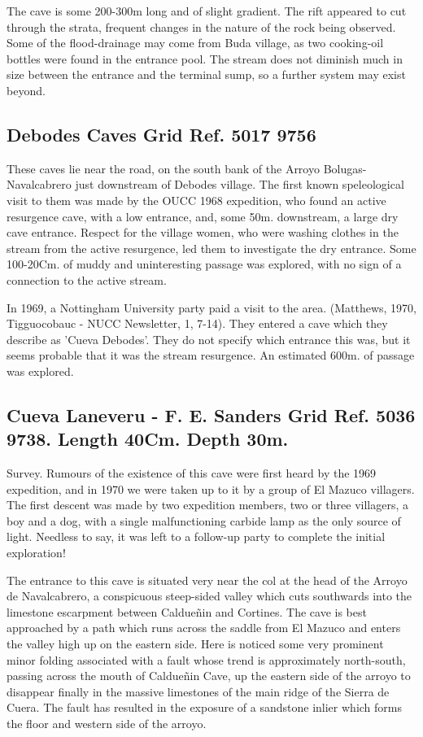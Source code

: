 \documentclass[11pt, a4paper, twoside]{memoir}
\begin{document}
The cave is some 200-300m long and of slight gradient. The rift appeared to cut through the strata, frequent changes in the nature of the rock being observed. Some of the flood-drainage may come from Buda village, as two cooking-oil bottles were found in the entrance pool. The stream does not diminish much in size between the entrance and the terminal sump, so a further system may exist beyond.



\subsection*{Debodes Caves Grid Ref. 5017 9756}


These caves lie near the road, on the south bank of the Arroyo Bolugas- Navalcabrero just downstream of Debodes village. The first known speleological visit to them was made by the OUCC 1968 expedition, who found an active resurgence cave, with a low entrance, and, some 50m. downstream, a large dry cave entrance. Respect for the village women, who were washing clothes in the stream from the active resurgence, led them to investigate the dry entrance. Some 100-20Cm. of muddy and uninteresting passage was explored, with no sign of a connection to the active stream.

In 1969, a Nottingham University party paid a visit to the area. (Matthews, 1970, Tigguocobauc - NUCC Newsletter, 1, 7-14). They entered a cave which they describe as 'Cueva Debodes'. They do not specify which entrance this was, but it seems probable that it was the stream resurgence. An estimated 600m. of passage was explored.



\subsection*{Cueva Laneveru - F. E. Sanders Grid Ref. 5036 9738. Length 40Cm. Depth 30m.}


Survey. Rumours of the existence of this cave were first heard by the 1969 expedition, and in 1970 we were taken up to it by a group of El Mazuco villagers. The first descent was made by two expedition members, two or three villagers, a boy and a dog, with a single malfunctioning carbide lamp as the only source of light. Needless to say, it was left to a follow-up party to complete the initial exploration!

The entrance to this cave is situated very near the col at the head of the Arroyo de Navalcabrero, a conspicuous steep-sided valley which cuts southwards into the limestone escarpment between Caldueñin and Cortines. The cave is best approached by a path which runs across the saddle from El Mazuco and enters the valley high up on the eastern side. Here is noticed some very prominent minor folding associated with a fault whose trend is approximately north-south, passing across the mouth of Caldueñin Cave, up the eastern side of the arroyo to disappear finally in the massive limestones of the main ridge of the Sierra de Cuera. The fault has resulted in the exposure of a sandstone inlier which forms the floor and western side of the arroyo.
\end{document}
